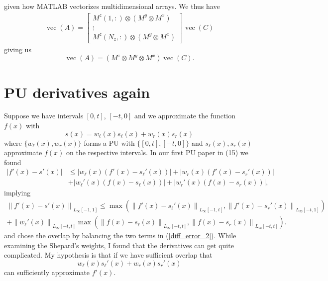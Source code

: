 \documentclass{article}
\newcommand{\lp}{\left(}
\newcommand{\rp}{\right)}
\DeclareMathOperator{\vecm}{vec}
\begin{document}
given how MATLAB vectorizes multidimensional arrays. We thus have
\begin{equation}
\begin{aligned}
	\vecm(A) = \begin{bmatrix}
		M^z(1,:) \otimes (M^y \otimes M^x) \\
		\vdots \\
		M^z(N_z,:) \otimes ( M^y \otimes M^x) 
	\end{bmatrix} \vecm(C)
\end{aligned}
\end{equation}
giving us
\begin{equation}
	\vecm(A) = (M^z \otimes M^y \otimes M^x) \vecm(C).
\end{equation}

\section{PU derivatives again}
Suppose we have intervals $[0,t]$, $[-t,0]$ and we approximate the function $f(x)$ with
\begin{equation}
s(x) = w_{\ell}(x)s_{\ell}(x) +w_{r}(x)s_{r}(x)	
\end{equation}
where $\{w_{\ell}(x),w_{r}(x)\}$ forms a PU with $\{[0,t],[-t,0]\}$ and $s_{\ell}(x),s_{r}(x)$ approximate $f(x)$ on the respective intervals. 
In our first PU paper in (15) we found
\begin{equation}
\begin{aligned}
\left | f'(x)-s'(x) \right | &\leq \left | w_{\ell}(x) \lp f'(x)-s_{\ell}'(x) \rp \right |+\left | w_{r}(x) \lp f'(x)-s_{r}'(x) \rp \right | \\
&+\left | w_{\ell
}'(x) \lp f(x)-s_{\ell}(x) \rp \right | +\left | w_{r}'(x) \lp f(x)-s_{r}(x) \rp \right |,
\end{aligned}
\end{equation}
implying
\begin{equation}
\begin{aligned}
\left \| f'(x)-s'(x) \right \|_{L_{\infty}[-1,1]} \leq \max \lp \left \| f'(x)-s_{\ell}'(x) \right \|_{L_{\infty}[-1,t]} , \left \| f'(x)-s_{r}'(x) \right \|_{L_{\infty}[-t,1]} \rp & \\
+\left \| w_{\ell}'(x) \right \|_{L_{\infty}[-t,t]} \max \lp \left \| f(x)-s_{\ell}(x)\right \|_{L_{\infty}[-t,t]}
, \left \| f(x)-s_{r}(x)\right \|_{L_{\infty}[-t,t]} \rp. &
\end{aligned}
\label{diff_error_2}
\end{equation}
and chose the overlap by balancing the two terms in (\ref{diff_error_2}). While examining the Shepard's weights, I found that the derivatives can get quite complicated. My hypothesis is that if we have sufficient overlap that
\begin{equation}
w_{\ell}(x)s_{\ell}'(x)+w_{r}(x)s_{r}'(x)	
\end{equation}
can sufficiently approximate $f'(x)$.
\end{document}
